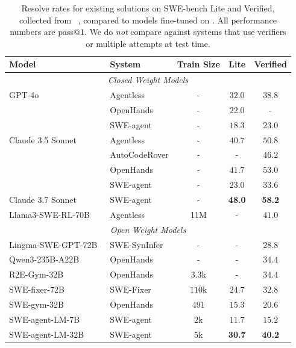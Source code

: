\begin{table}[ht]
    \centering
    \begin{tabular}{ll|ccc}
\toprule
Model & System & Train Size & Lite & Verified  \\
\midrule
\multicolumn{5}{c}{\textit{Closed Weight Models}} \\
\midrule
GPT-4o~\citep{openai2024gpt4ocard} & Agentless & - & $32.0$ & $38.8$ \\
                    & OpenHands & - & $22.0$ & -      \\
                    & SWE-agent & - & $18.3$ & $23.0$ \\
Claude 3.5 Sonnet~\citep{anthropicclaude35} & Agentless & - & $40.7$ & $50.8$ \\
                    & AutoCodeRover & - & -  & $46.2$ \\
                    & OpenHands & - & $41.7$ & $53.0$ \\
                    & SWE-agent & - & $23.0$ & $33.6$ \\
Claude 3.7 Sonnet~\citep{anthropicclaude37}   & SWE-agent & - & \textbf{48.0} & \textbf{58.2} \\
Llama3-SWE-RL-70B~\citep{wei2025swerladvancingllmreasoning}  & Agentless & 11M & -      & $41.0$ \\
\midrule
\multicolumn{5}{c}{\textit{Open Weight Models}} \\
\midrule
Lingma-SWE-GPT-72B~\citep{ma2024lingmaswegptopendevelopmentprocesscentric} & SWE-SynInfer & - & - & $28.8$ \\
Qwen3-235B-A22B~\citep{qwen_qwen25_2025} & OpenHands & - & - & $34.4$ \\
R2E-Gym-32B~\citep{jain2025r2e-gym} & OpenHands & $3.3$k & -      & $34.4$ \\
SWE-fixer-72B~\citep{xie2025swefixertrainingopensourcellms} & SWE-Fixer & $110$k & $24.7$ & $32.8$ \\
SWE-gym-32B~\citep{pan_training_2024} & OpenHands & $491$  & $15.3$ & $20.6$ \\
SWE-agent-LM-7B     & SWE-agent & $2$k   & $11.7$ & $15.2$  \\
SWE-agent-LM-32B    & SWE-agent & $5$k   & \textbf{30.7} & \textbf{40.2} \\
\bottomrule
    \end{tabular}
    \caption{
    Resolve rates for existing solutions on SWE-bench Lite and Verified, collected from ~\citet{jimenez2024leaderboard}, compared to models fine-tuned on \bugs{}.
    All performance numbers are pass@$1$.
    We do \textit{not} compare against systems that use verifiers or multiple attempts at test time.
    }
    \label{tab:main_results}
\end{table}
